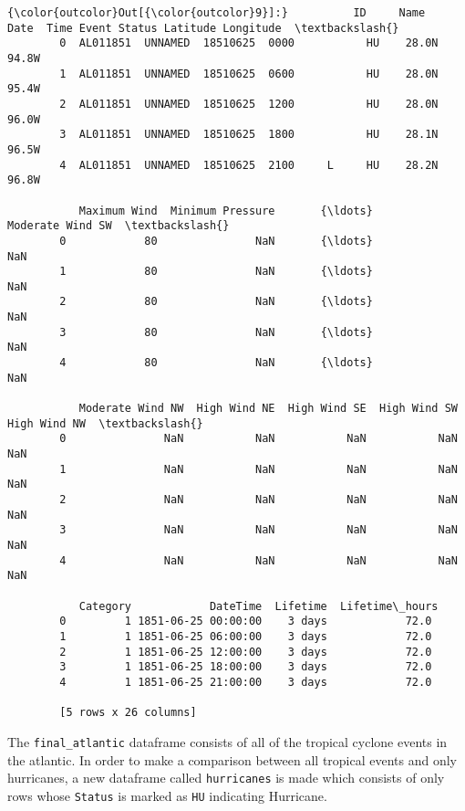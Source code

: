 \documentclass[11pt]{article}
\begin{document}
\begin{Verbatim}[commandchars=\\\{\}]
{\color{outcolor}Out[{\color{outcolor}9}]:}          ID     Name      Date  Time Event Status Latitude Longitude  \textbackslash{}
        0  AL011851  UNNAMED  18510625  0000           HU    28.0N     94.8W   
        1  AL011851  UNNAMED  18510625  0600           HU    28.0N     95.4W   
        2  AL011851  UNNAMED  18510625  1200           HU    28.0N     96.0W   
        3  AL011851  UNNAMED  18510625  1800           HU    28.1N     96.5W   
        4  AL011851  UNNAMED  18510625  2100     L     HU    28.2N     96.8W   
        
           Maximum Wind  Minimum Pressure       {\ldots}        Moderate Wind SW  \textbackslash{}
        0            80               NaN       {\ldots}                     NaN   
        1            80               NaN       {\ldots}                     NaN   
        2            80               NaN       {\ldots}                     NaN   
        3            80               NaN       {\ldots}                     NaN   
        4            80               NaN       {\ldots}                     NaN   
        
           Moderate Wind NW  High Wind NE  High Wind SE  High Wind SW  High Wind NW  \textbackslash{}
        0               NaN           NaN           NaN           NaN           NaN   
        1               NaN           NaN           NaN           NaN           NaN   
        2               NaN           NaN           NaN           NaN           NaN   
        3               NaN           NaN           NaN           NaN           NaN   
        4               NaN           NaN           NaN           NaN           NaN   
        
           Category            DateTime  Lifetime  Lifetime\_hours  
        0         1 1851-06-25 00:00:00    3 days            72.0  
        1         1 1851-06-25 06:00:00    3 days            72.0  
        2         1 1851-06-25 12:00:00    3 days            72.0  
        3         1 1851-06-25 18:00:00    3 days            72.0  
        4         1 1851-06-25 21:00:00    3 days            72.0  
        
        [5 rows x 26 columns]
\end{Verbatim}
            
    The \texttt{final\_atlantic} dataframe consists of all of the tropical
cyclone events in the atlantic. In order to make a comparison between
all tropical events and only hurricanes, a new dataframe called
\texttt{hurricanes} is made which consists of only rows whose
\texttt{Status} is marked as \texttt{HU} indicating Hurricane.
\end{document}
